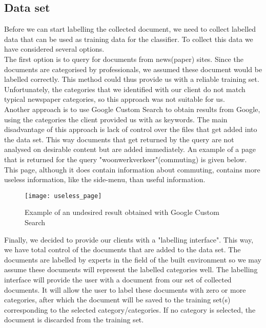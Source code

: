 \subsection{Data set}
Before we can start labelling the collected document, we need to collect labelled data that can be used as training data for the classifier. To collect this data we have considered several options.\\

The first option is to query for documents from news(paper) sites. Since the documents are categorised by professionals, we assumed these document would be labelled correctly. This method could thus provide us with a reliable training set.
Unfortunately, the categories that we identified with our client do not match typical newspaper categories, so this approach was not suitable for us.\\

Another approach is to use Google Custom Search to obtain results from Google, using the categories the client provided us with as keywords. The main disadvantage of this approach is lack of control over the files that get added into the data set. This way documents that get returned by the query are not analysed on desirable content but are added immediately. An example of a page that is returned for the query "woonwerkverkeer"(commuting) is given below. This page, although it does contain information about commuting, contains more useless information, like the side-menu, than useful information.\\

\begin{figure}[H]
\centering
\texttt{[image: useless\_page]}
\caption{Example of an undesired result obtained with Google Custom Search}
\label{fig:useless_page}
\end{figure}

Finally, we decided to provide our clients with a "labelling interface". This way, we have total control of the documents that are added to the data set. The documents are labelled by experts in the field of the built environment so we may assume these documents will represent the labelled categories well. The labelling interface will provide the user with a document from our set of collected documents. It will allow the user to label these documents with zero or more categories, after which the document will be saved to the training set(s) corresponding to the selected category/categories. If no category is selected, the document is discarded from the training set. 

